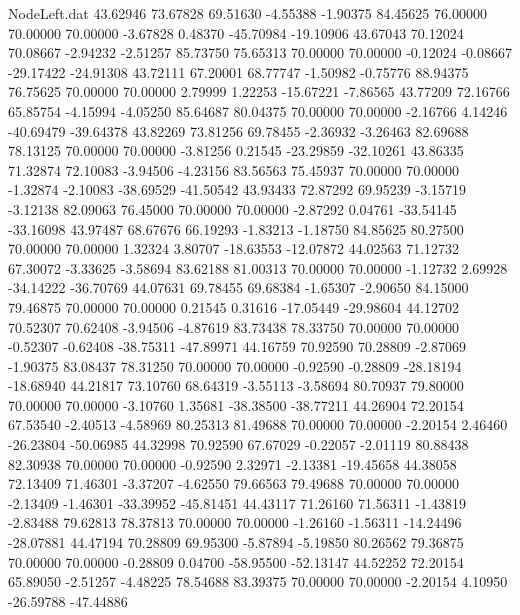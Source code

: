 \begin{filecontents}{NodeLeft.dat}
  43.62946   73.67828   69.51630    -4.55388   -1.90375   84.45625   76.00000   70.00000   70.00000   -3.67828    0.48370  -45.70984  -19.10906
  43.67043   70.12024   70.08667    -2.94232   -2.51257   85.73750   75.65313   70.00000   70.00000   -0.12024   -0.08667  -29.17422  -24.91308
  43.72111   67.20001   68.77747    -1.50982   -0.75776   88.94375   76.75625   70.00000   70.00000    2.79999    1.22253  -15.67221   -7.86565
  43.77209   72.16766   65.85754    -4.15994   -4.05250   85.64687   80.04375   70.00000   70.00000   -2.16766    4.14246  -40.69479  -39.64378
  43.82269   73.81256   69.78455    -2.36932   -3.26463   82.69688   78.13125   70.00000   70.00000   -3.81256    0.21545  -23.29859  -32.10261
  43.86335   71.32874   72.10083    -3.94506   -4.23156   83.56563   75.45937   70.00000   70.00000   -1.32874   -2.10083  -38.69529  -41.50542
  43.93433   72.87292   69.95239    -3.15719   -3.12138   82.09063   76.45000   70.00000   70.00000   -2.87292    0.04761  -33.54145  -33.16098
  43.97487   68.67676   66.19293    -1.83213   -1.18750   84.85625   80.27500   70.00000   70.00000    1.32324    3.80707  -18.63553  -12.07872
  44.02563   71.12732   67.30072    -3.33625   -3.58694   83.62188   81.00313   70.00000   70.00000   -1.12732    2.69928  -34.14222  -36.70769
  44.07631   69.78455   69.68384    -1.65307   -2.90650   84.15000   79.46875   70.00000   70.00000    0.21545    0.31616  -17.05449  -29.98604
  44.12702   70.52307   70.62408    -3.94506   -4.87619   83.73438   78.33750   70.00000   70.00000   -0.52307   -0.62408  -38.75311  -47.89971
  44.16759   70.92590   70.28809    -2.87069   -1.90375   83.08437   78.31250   70.00000   70.00000   -0.92590   -0.28809  -28.18194  -18.68940
  44.21817   73.10760   68.64319    -3.55113   -3.58694   80.70937   79.80000   70.00000   70.00000   -3.10760    1.35681  -38.38500  -38.77211
  44.26904   72.20154   67.53540    -2.40513   -4.58969   80.25313   81.49688   70.00000   70.00000   -2.20154    2.46460  -26.23804  -50.06985
  44.32998   70.92590   67.67029    -0.22057   -2.01119   80.88438   82.30938   70.00000   70.00000   -0.92590    2.32971   -2.13381  -19.45658
  44.38058   72.13409   71.46301    -3.37207   -4.62550   79.66563   79.49688   70.00000   70.00000   -2.13409   -1.46301  -33.39952  -45.81451
  44.43117   71.26160   71.56311    -1.43819   -2.83488   79.62813   78.37813   70.00000   70.00000   -1.26160   -1.56311  -14.24496  -28.07881
  44.47194   70.28809   69.95300    -5.87894   -5.19850   80.26562   79.36875   70.00000   70.00000   -0.28809    0.04700  -58.95500  -52.13147
  44.52252   72.20154   65.89050    -2.51257   -4.48225   78.54688   83.39375   70.00000   70.00000   -2.20154    4.10950  -26.59788  -47.44886

\end{filecontents}
